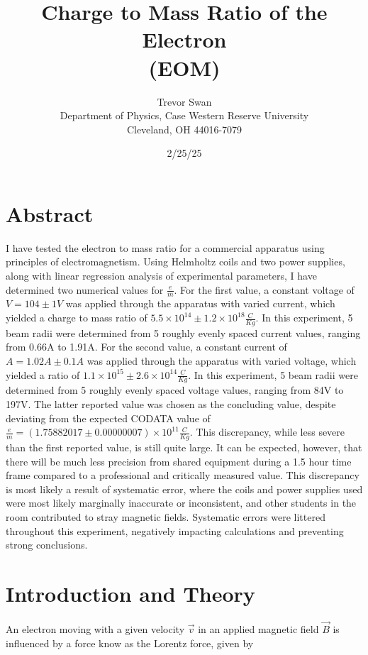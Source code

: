 \documentclass[12pt]{article}
\title{Charge to Mass Ratio of the Electron \\ \small (EOM)}
\author{Trevor Swan \\
Department of Physics, Case Western Reserve University \\
Cleveland, OH 44016-7079}
\date{2/25/25}
\begin{document}
\pagestyle{fancy}
\fancyhf{}

\maketitle
\thispagestyle{fancy}
\renewcommand{\headrulewidth}{0pt}

\fancyfoot[C]{\thepage}

\section{Abstract}
I have tested the electron to mass ratio for a commercial apparatus using principles of electromagnetism. Using Helmholtz coils and two power supplies, along with linear regression analysis of experimental parameters, I have determined two numerical values for $\frac{e}{m}$. For the first value, a constant voltage of $V=104\pm1V$ was applied through the apparatus with varied current, which yielded a charge to mass ratio of $5.5\times10^{14}\pm1.2\times10^{18} \frac{C}{Kg}$. In this experiment, 5 beam radii were determined from 5 roughly evenly spaced current values, ranging from 0.66A to 1.91A. For the second value, a constant current of $A=1.02A\pm0.1A$ was applied through the apparatus with varied voltage, which yielded a ratio of $1.1\times10^{15}\pm2.6\times10^{14} \frac{C}{Kg}$. In this experiment, 5 beam radii were determined from 5 roughly evenly spaced voltage values, ranging from 84V to 197V. The latter reported value was chosen as the concluding value, despite deviating from the expected CODATA value of $\frac{e}{m}=(1.75882017\pm0.00000007)\times10^{11} \frac{C}{Kg}$. This discrepancy, while less severe than the first reported value, is still quite large. It can be expected, however, that there will be much less precision from shared equipment during a 1.5 hour time frame compared to a professional and critically measured value. This discrepancy is most likely a result of systematic error, where the coils and power supplies used were most likely marginally inaccurate or inconsistent, and other students in the room contributed to stray magnetic fields. Systematic errors were littered throughout this experiment, negatively impacting calculations and preventing strong conclusions.

\section{Introduction and Theory}
An electron moving with a given velocity $\vec{v}$ in an applied magnetic field $\vec{B}$ is influenced by a force know as the Lorentz force, given by
\end{document}
